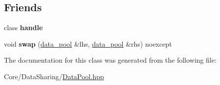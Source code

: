 \subsection*{Friends}
\begin{DoxyCompactItemize}
\item 
\mbox{\label{classsequoia_1_1data__sharing_1_1data__pool_ad5131fca8411651b7eaed9ca2b4a6fef}} 
class {\bfseries handle}
\item 
\mbox{\label{classsequoia_1_1data__sharing_1_1data__pool_a03f19e206e863c72f4037e4148e4814d}} 
void {\bfseries swap} (\mbox{\hyperlink{classsequoia_1_1data__sharing_1_1data__pool}{data\+\_\+pool}} \&lhs, \mbox{\hyperlink{classsequoia_1_1data__sharing_1_1data__pool}{data\+\_\+pool}} \&rhs) noexcept
\end{DoxyCompactItemize}


The documentation for this class was generated from the following file\+:\begin{DoxyCompactItemize}
\item 
Core/\+Data\+Sharing/\mbox{\hyperlink{_data_pool_8hpp}{Data\+Pool.\+hpp}}\end{DoxyCompactItemize}
